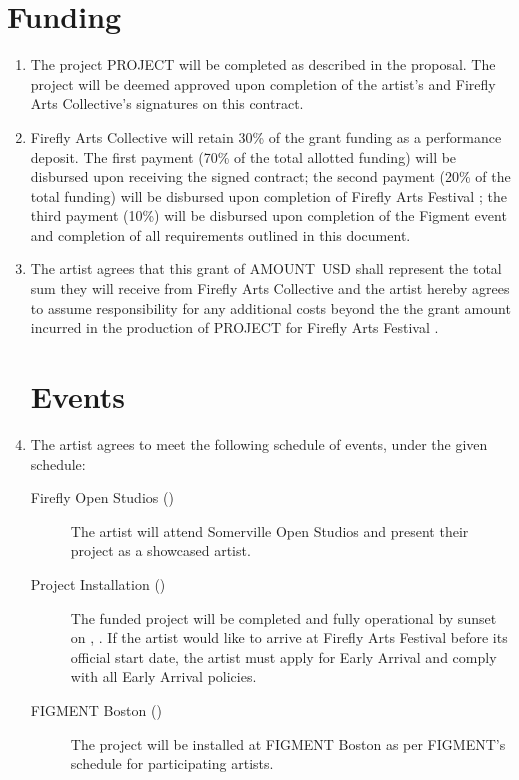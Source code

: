 \documentclass[11pt]{article}
\newcommand{\fac}{Firefly Arts Collective}
\newcommand{\project}{PROJECT}
\newcommand{\amount}{AMOUNT}
\begin{document}
\section*{Funding}
\begin{enumerate}
\item The project \project{} will be completed as described in the proposal.  The project will be deemed approved upon
  completion of the artist's and \fac{}'s signatures on this contract.

\item \fac{} will retain 30\% of the grant funding as a performance deposit.  The first payment (70\% of the total allotted
  funding) will be disbursed upon receiving the signed contract; the second payment (20\% of the total funding)
  will be disbursed upon completion of Firefly Arts Festival \the\year{}; the third payment (10\%) will be disbursed upon
  completion of the Figment \the\year{} event and completion of all requirements outlined in this document.

\item The artist agrees that this grant of \amount{}\ USD shall represent the total sum they will receive from \fac{} and the artist hereby
  agrees to assume responsibility for any additional costs beyond the the grant amount incurred in the production of
  \project{} for Firefly Arts Festival \the\year{}.

\section*{Events}
\item The artist agrees to meet the following schedule of events, under the given schedule:

  \begin{description}
    \item[Firefly Open Studios (\sosdates{})] The artist will attend Somerville Open Studios and present their project
      as a showcased artist.
    \item[Project Installation (\instdate{})] The funded project will be completed and fully operational by sunset on
      \instday{}, \instdate{}.  If the artist would like to arrive at Firefly Arts Festival before its official start
      date, the artist must apply for Early Arrival and comply with all Early Arrival policies.
    \item[FIGMENT Boston \the\year{} (\figdates{})] The project will be installed at FIGMENT Boston \the\year{}
      as per FIGMENT's schedule for participating artists.
  \end{description}


\end{enumerate}
\end{document}
